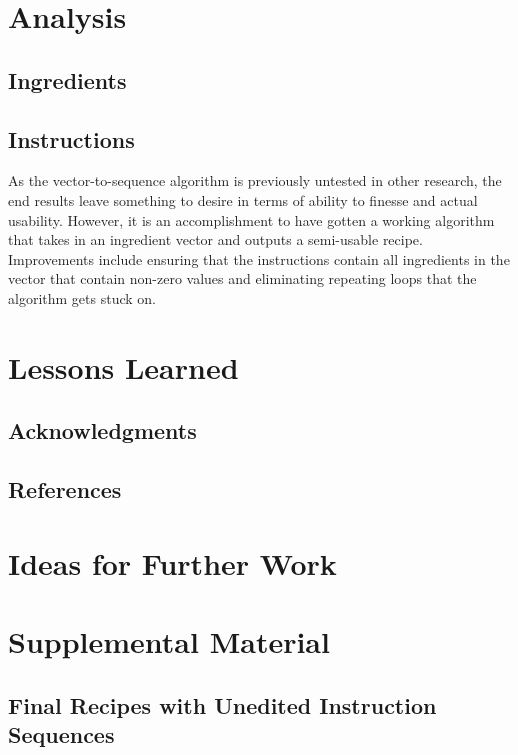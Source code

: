 \documentclass[11pt, a4paper]{article}
\begin{document}
		\section{Analysis}	
		\subsection{Ingredients}
		\subsection{Instructions}
		As the vector-to-sequence algorithm is previously untested in other research, the end results leave something to desire in terms of ability to finesse and actual usability. However, it is an accomplishment to have gotten a working algorithm that takes in an ingredient vector and outputs a semi-usable recipe. Improvements include ensuring that the instructions contain all ingredients in the vector that contain non-zero values and eliminating repeating loops that the algorithm gets stuck on.
		\section{Lessons Learned}

		\subsection*{Acknowledgments}
		\subsection*{References}
		\section{Ideas for Further Work}
		\section{Supplemental Material}
		\subsection{Final Recipes with Unedited Instruction Sequences}
\end{document}

